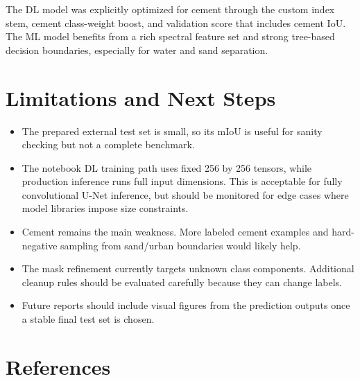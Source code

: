 \documentclass[11pt,a4paper]{article}
\begin{document}
The DL model was explicitly optimized for cement through the custom index stem, cement class-weight boost, and validation score that includes cement IoU. The ML model benefits from a rich spectral feature set and strong tree-based decision boundaries, especially for water and sand separation.

\section{Limitations and Next Steps}

\begin{itemize}
  \item The prepared external test set is small, so its mIoU is useful for sanity checking but not a complete benchmark.
  \item The notebook DL training path uses fixed 256 by 256 tensors, while production inference runs full input dimensions. This is acceptable for fully convolutional U-Net inference, but should be monitored for edge cases where model libraries impose size constraints.
  \item Cement remains the main weakness. More labeled cement examples and hard-negative sampling from sand/urban boundaries would likely help.
  \item The mask refinement currently targets unknown class components. Additional cleanup rules should be evaluated carefully because they can change labels.
  \item Future reports should include visual figures from the prediction outputs once a stable final test set is chosen.
\end{itemize}

\section{References}
\end{document}
